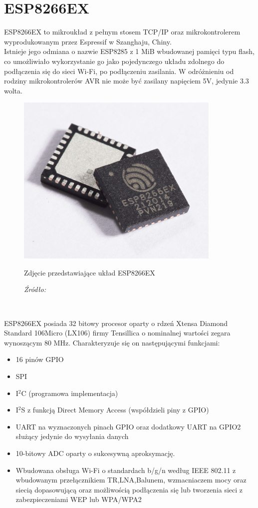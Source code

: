\documentclass[12pt,a4paper,oneside]{memoir}
\begin{document}
\section{ESP8266EX}
\par ESP8266EX to mikroukład z pełnym stosem TCP/IP oraz mikrokontrolerem wyprodukowanym przez Espressif w Szanghaju, Chiny.\\
Istnieje jego odmiana o nazwie ESP8285 z 1 MiB wbudowanej pamięci typu flash, co umożliwiało wykorzystanie go jako pojedynczego układu zdolnego do podłączenia się do sieci Wi-Fi, po podłączeniu zasilania. W odróżnieniu od rodziny mikrokontrolerów AVR nie może być zasilany napięciem 5V, jedynie 3.3 wolta.\\
\begin{figure}[h]
	\centering
	\includegraphics[scale=0.5]{images/esp8266ex.jpg}
	{\tytulyrozdzialow \footnotesize \caption[ESP8266EX]{Zdjęcie przedstawiające układ ESP8266EX}
	\caption*{\textit{Źródło: \cite{esp8266chip}}}}
\end{figure}\\
\par ESP8266EX \cite{esp8266wiki} posiada 32 bitowy procesor oparty o rdzeń Xtensa Diamond Standard 106Micro (LX106) firmy Tensillica o nominalnej wartości zegara wynoszącym 80 MHz. Charakteryzuje się on następującymi funkcjami:
\begin{itemize}
	\item 16 pinów GPIO
	\item SPI
	\item I$^2$C (programowa implementacja)
	\item I$^2$S z funkcją Direct Memory Access (współdzieli piny z GPIO)
	\item UART na wyznaczonych pinach GPIO oraz dodatkowy UART na GPIO2 służący jedynie do wysyłania danych
	\item 10-bitowy ADC oparty o sukcesywną aproksymację.
	\item Wbudowana obsługa Wi-Fi o standardach b/g/n według IEEE 802.11 z wbudowanym przełącznikiem TR,LNA,Balunem, wzmacniaczem mocy oraz siecią dopasowującą oraz możliwością podłączenia się lub tworzenia sieci z zabezpieczeniami WEP lub WPA/WPA2
\end{itemize}
\end{document}
